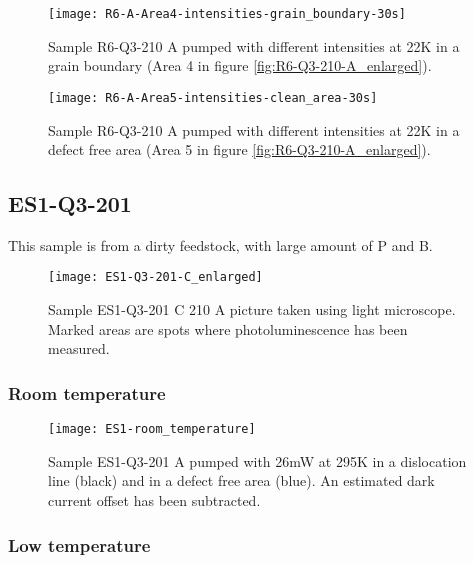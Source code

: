 \begin{figure}[H]
\centering
\texttt{[image: R6-A-Area4-intensities-grain\_boundary-30s]}
\caption[R6-Q3-210 at a grain boundary]{Sample R6-Q3-210 A pumped with different intensities at 22K in a grain boundary (Area 4 in figure \ref{fig:R6-Q3-210-A_enlarged}).}
\label{fig:R6-A-Area4-intensities-grain_boundary-30s}%
\end{figure}


\begin{figure}[H]
\centering
\texttt{[image: R6-A-Area5-intensities-clean\_area-30s]}
\caption[R6-Q3-210 at a defect free area]{Sample R6-Q3-210 A pumped with different intensities at 22K in a defect free area (Area 5 in figure \ref{fig:R6-Q3-210-A_enlarged}).}
\label{fig:R6-A-Area5-intensities-clean_area-30s}%
\end{figure}








\subsection{ES1-Q3-201}

This sample is from a dirty feedstock, with large amount of P and B.


\begin{figure}[H]
\centering
\texttt{[image: ES1-Q3-201-C\_enlarged]}
\caption[ES1-Q3-201 C from light microscope]{Sample ES1-Q3-201 C 210 A picture taken using light microscope. Marked areas are spots where photoluminescence has been measured.}
\label{fig:ES1-Q3-201-C_enlarged}%
\end{figure}

\subsubsection{Room temperature}

\begin{figure}[H]
\centering
\texttt{[image: ES1-room\_temperature]}
\caption[ES1-Q3-201 at room temperature]{Sample ES1-Q3-201 A pumped with 26mW at 295K in a dislocation line (black) and in a defect free area (blue). An estimated dark current offset has been subtracted.}
\label{fig:ES1-room_temperature}%
\end{figure}


\subsubsection{Low temperature}

